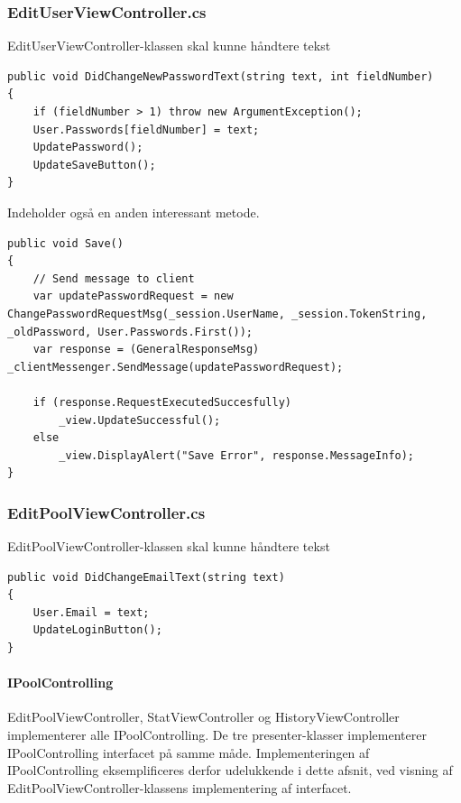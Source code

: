 \subsubsection{EditUserViewController.cs}
EditUserViewController-klassen skal kunne håndtere tekst

\begin{lstlisting}[caption={DidChangeNewPasswordText(...)},label={code:application_impl_euvcdcnpw}]
public void DidChangeNewPasswordText(string text, int fieldNumber)
{
	if (fieldNumber > 1) throw new ArgumentException();
	User.Passwords[fieldNumber] = text;
	UpdatePassword();
	UpdateSaveButton();
}
\end{lstlisting}

Indeholder også en anden interessant metode.

\begin{lstlisting}[caption={Save()},label={code:application_impl_euvcsave}]
public void Save()
{
	// Send message to client
	var updatePasswordRequest = new ChangePasswordRequestMsg(_session.UserName, _session.TokenString, _oldPassword, User.Passwords.First());
	var response = (GeneralResponseMsg) _clientMessenger.SendMessage(updatePasswordRequest);

	if (response.RequestExecutedSuccesfully)
		_view.UpdateSuccessful();
	else
		_view.DisplayAlert("Save Error", response.MessageInfo);
}
\end{lstlisting}

\subsubsection{EditPoolViewController.cs}
EditPoolViewController-klassen skal kunne håndtere tekst

\begin{lstlisting}[caption={DidChangeEmailText(...)},label={code:application_impl_lvcdcet}]
public void DidChangeEmailText(string text)
{
	User.Email = text;
	UpdateLoginButton();
}
\end{lstlisting}

\paragraph{IPoolControlling}
EditPoolViewController, StatViewController og HistoryViewController implementerer alle IPoolControlling. De tre presenter-klasser implementerer IPoolControlling interfacet på samme måde. Implementeringen af IPoolControlling eksemplificeres derfor udelukkende i dette afsnit, ved visning af EditPoolViewController-klassens implementering af interfacet.

